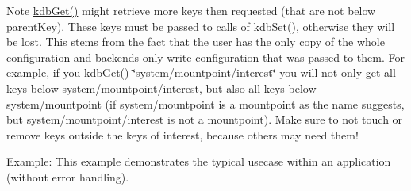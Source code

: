 \begin{DoxyNote}{Note}
\hyperlink{group__kdb_ga28e385fd9cb7ccfe0b2f1ed2f62453a1}{kdb\+Get()} might retrieve more keys then requested (that are not below parent\+Key). These keys must be passed to calls of \hyperlink{group__kdb_ga11436b058408f83d303ca5e996832bcf}{kdb\+Set()}, otherwise they will be lost. This stems from the fact that the user has the only copy of the whole configuration and backends only write configuration that was passed to them. For example, if you \hyperlink{group__kdb_ga28e385fd9cb7ccfe0b2f1ed2f62453a1}{kdb\+Get()} \char`\"{}system/mountpoint/interest\char`\"{} you will not only get all keys below system/mountpoint/interest, but also all keys below system/mountpoint (if system/mountpoint is a mountpoint as the name suggests, but system/mountpoint/interest is not a mountpoint). Make sure to not touch or remove keys outside the keys of interest, because others may need them!
\end{DoxyNote}
\begin{DoxyParagraph}{Example\+:}
This example demonstrates the typical usecase within an application (without error handling).
\end{DoxyParagraph}

